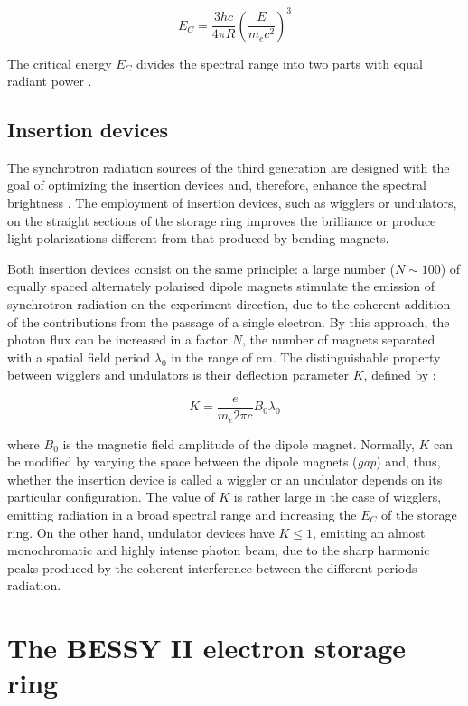 \begin{equation}
        E_C=\frac{3hc}{4\pi R}\left(\frac{E}{m_e c^2}\right)^3
\end{equation}

The critical energy $E_C$ divides the spectral range into two parts with equal radiant power \citep{marr_handbook_1987}.

\subsection{Insertion devices}

The synchrotron radiation sources of the third generation are designed with the goal of optimizing the insertion devices and, therefore, enhance the spectral brightness \citep{ries_nonlinear_2014}. The employment of insertion devices, such as wigglers or undulators, on the straight sections of the storage ring improves the brilliance or produce light polarizations different from that produced by bending magnets.

Both insertion devices consist on the same principle: a large number ($N\sim100$) of equally spaced alternately polarised dipole magnets stimulate the emission of synchrotron radiation on the experiment direction, due to the coherent addition of the contributions from the passage of a single electron. By this approach, the photon flux can be increased  in a factor $N$, the number of magnets separated with a spatial field period $\lambda_0$ in the range of cm. The distinguishable property between wigglers and undulators is their deflection parameter $K$, defined by \citep{marr_handbook_1987}:

\begin{equation}
        K=\frac{e}{m_e 2\pi c}B_0\lambda_0
\end{equation}

where $B_0$ is the magnetic field amplitude of the dipole magnet. Normally, $K$ can be modified by varying the space between the dipole magnets (\emph{gap}) and, thus, whether the insertion device is  called a wiggler or an undulator depends on its particular configuration. The value of $K$ is rather large in the case of wigglers, emitting radiation in a broad spectral range and increasing the $E_C$ of the storage ring. On the other hand, undulator devices have $K\leq1$, emitting an almost monochromatic and highly intense photon beam, due to the sharp harmonic peaks produced by the coherent interference between the different periods radiation.

\section{The BESSY II electron storage ring}

